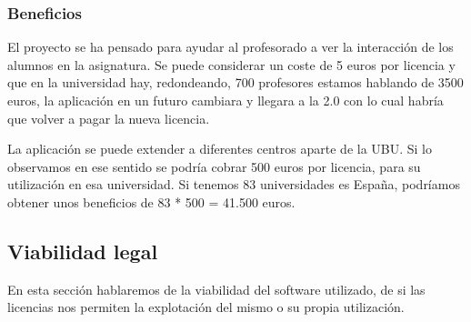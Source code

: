 \subsubsection{Beneficios}

El proyecto se ha pensado para ayudar al profesorado a ver la interacción de los alumnos en la asignatura. Se puede considerar un coste de 5 euros por licencia y que en la universidad hay, redondeando, 700 profesores estamos hablando de 3500 euros, la aplicación en un futuro cambiara y llegara a la 2.0 con lo cual habría que volver a pagar la nueva licencia.

La aplicación se puede extender a diferentes centros aparte de la UBU.
Si lo observamos en ese sentido se podría cobrar 500 euros por licencia, para su utilización en esa universidad. Si tenemos 83 universidades es España, podríamos obtener unos beneficios de 83 * 500 = 41.500 euros.

\subsection{Viabilidad legal}

En esta sección hablaremos de la viabilidad del software utilizado, de si las licencias nos permiten la explotación del mismo o su propia utilización.

